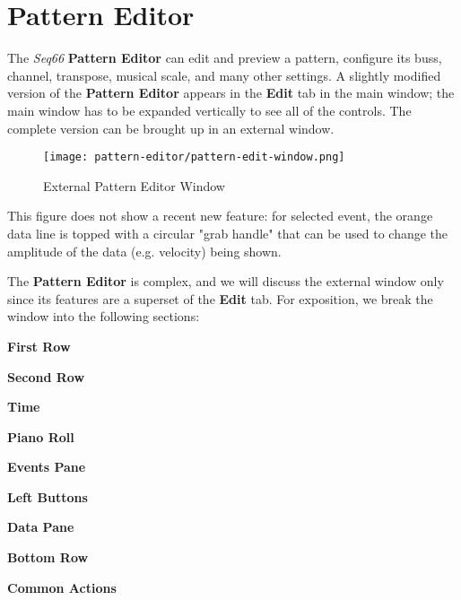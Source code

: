 %
%

\section{Pattern Editor}
\label{sec:pattern_editor}

   The \textsl{Seq66} \textbf{Pattern Editor} can edit and preview a
   pattern, configure its buss, channel, transpose, musical
   scale, and many other settings.
   A slightly modified  version of the \textbf{Pattern Editor} appears in the
   \textbf{Edit} tab in the main window; the main window has to be expanded
   vertically to see all of the controls.
   The complete version can be brought up in an external window.

\begin{figure}[H]
   \centering 
   \texttt{[image: pattern-editor/pattern-edit-window.png]}
   \caption{External Pattern Editor Window}
   \label{fig:pattern_editor_window}
\end{figure}

   This figure does not show a recent new feature: for selected event,
   the orange data line is topped with a circular "grab handle" that can
   be used to change the amplitude of the data (e.g. velocity) being
   shown.
  
   The \textbf{Pattern Editor} is complex, and we will discuss the external
   window only since its features are a superset of the \textbf{Edit} tab.
   For exposition, we break the window into the following sections:

   \begin{enumber}
      \item \textbf{First Row}
      \item \textbf{Second Row}
      \item \textbf{Time}
      \item \textbf{Piano Roll}
      \item \textbf{Events Pane}
      \item \textbf{Left Buttons}
      \item \textbf{Data Pane}
      \item \textbf{Bottom Row}
      \item \textbf{Common Actions}
   \end{enumber}

